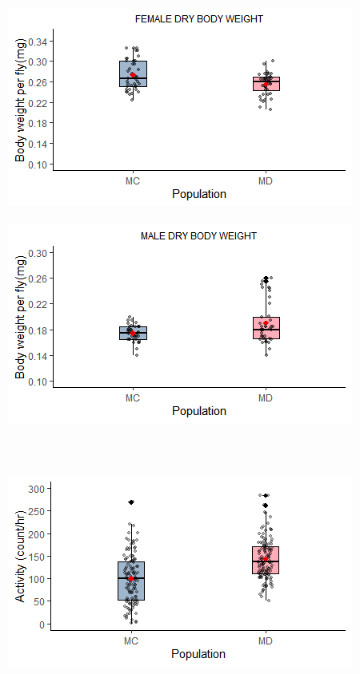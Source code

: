 \documentclass[12pt,onecolumn,twoside]{article}
\begin{document}
	\begin{figure}
		\centering
		\begin{subfigure}{0.49\textwidth}
			\includegraphics[width=\textwidth, keepaspectratio]{fig1c.png}
			\subcaption{\label{fig2a}\empty}
		\end{subfigure}
		\begin{subfigure}{0.49\textwidth}
			\includegraphics[width=\textwidth, keepaspectratio]{fig1d.png}
			\subcaption{\label{fig2b}\empty}
		\end{subfigure}\\
		\begin{subfigure}{0.49\textwidth}
			\includegraphics[width=\textwidth, keepaspectratio]{fig1e.png}

\end{subfigure}
\end{figure}
\end{document}
